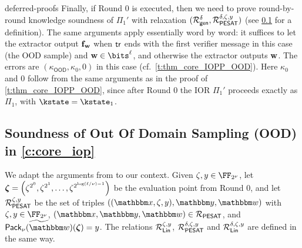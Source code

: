 \begin{lncsappendix}{deferred-proofs}
Finally, if Round 0 is executed, then we need to prove round-by-round knowledge soundness of $\Pi_1'$ with relaxation $(\mathcal{R}_{\mathsf{gen}}^{\delta},\mathcal{R}_{\mathsf{PESAT}}^{\delta,\zeta,y})$ (see \cref{a:OOD} for a definition). The same arguments apply essentially word by word:  it suffices to let the extractor output $\mathbf{f}_{\mathbf{w}}$ when $\mathsf{tr}$ ends with the first verifier message in this case (the OOD sample) and $\ww\in\bits^{\codedim}$, and otherwise the extractor outputs $\mathbf{w}$. The errors are $(\kappa_{\mathsf{OOD}},\kappa_0,0)$ in this case (cf.\ \cref{t:thm_core_IOPP_OOD}). Here $\kappa_0$ and $0$ follow from the same arguments as in the proof of \cref{t:thm_core_IOPP_OOD}, since after Round 0 the IOR $\Pi_1'$ proceeds exactly as $\Pi_1$, with $\kstate=\kstate_1$.


\subsection{Soundness of Out Of Domain Sampling (OOD) in \cref{c:core_iop}}\label{a:OOD}





We adapt the arguments from \cite{stir,whir} to our context. Given $\zeta,y\in \comfield$, let $\bm{\zeta}= \left(\zeta^{2^0}, \zeta^{2^1}, \ldots, \zeta^{2^{\log (\ell/\nu) -1}}\right)$ be the evaluation point from Round 0, and  let $\mathcal{R}_{\mathsf{PESAT}}^{\zeta,y}$ be the set of triples $((\inp, \zeta, y), \oracle, \wit)$ with $\zeta,y\in\comfield$, $(\inp,\oracle,\wit)\in \PESAT$, and $\mle{\pack(\wit)}(\bm{\zeta})=y$. The relations $\mathcal{R}_{\mathsf{Lin}}^{\zeta,y}$, $\mathcal{R}_{\mathsf{PESAT}}^{\delta,\zeta,y}$ and $\mathcal{R}_{\mathsf{Lin}}^{\delta,\zeta,y}$ are defined in the same way. 


\end{lncsappendix}
